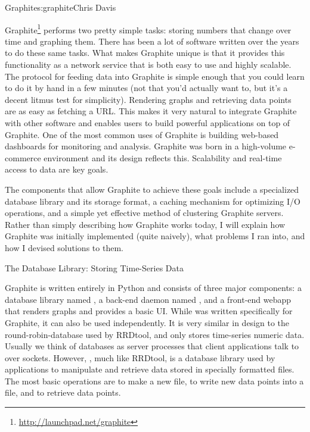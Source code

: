 \begin{aosachapter}{Graphite}{s:graphite}{Chris Davis}

Graphite\footnote{\url{http://launchpad.net/graphite}} performs two
pretty simple tasks: storing numbers that change over time and
graphing them. There has been a lot of software written over the years
to do these same tasks.  What makes Graphite unique is that it
provides this functionality as a network service that is both easy to
use and highly scalable.  The protocol for feeding data into Graphite
is simple enough that you could learn to do it by hand in a few
minutes (not that you'd actually want to, but it's a decent litmus
test for simplicity).  Rendering graphs and retrieving data points are
as easy as fetching a URL\@.  This makes it very natural to integrate
Graphite with other software and enables users to build powerful
applications on top of Graphite.  One of the most common uses of
Graphite is building web-based dashboards for monitoring and analysis.
Graphite was born in a high-volume e-commerce environment and its
design reflects this.  Scalability and real-time access to data are
key goals.

The components that allow Graphite to achieve these goals include a
specialized database library and its storage format, a caching
mechanism for optimizing I/O operations, and a simple yet effective
method of clustering Graphite servers. Rather than simply
describing how Graphite works today, I will explain how Graphite was
initially implemented (quite naively), what problems I ran into, and
how I devised solutions to them.

\begin{aosasect1}{The Database Library: Storing Time-Series Data}

Graphite is written entirely in Python and consists of three major
components: a database library named , a back-end daemon named
, and a front-end webapp that renders graphs and provides a
basic UI\@. While  was written specifically for Graphite, it can
also be used independently. It is very similar in design to the
round-robin-database used by RRDtool, and only stores time-series
numeric data.  Usually we think of databases as server processes that
client applications talk to over sockets. However, , much like
RRDtool, is a database library used by applications to manipulate and
retrieve data stored in specially formatted files. The most basic
 operations are  to make a new  file,
 to write new data points into a file, and 
to retrieve data points.


\end{aosasect1}
\end{aosachapter}
